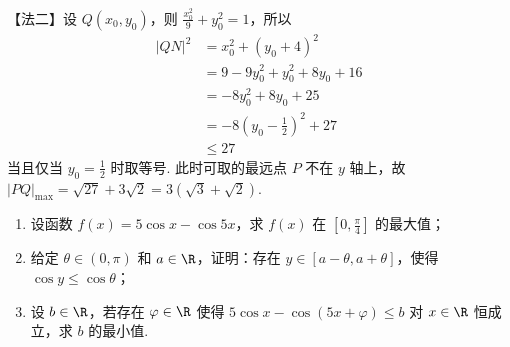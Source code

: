 \begin{solution}
\begin{enumerate}
\begin{enumerate}
【法二】设 \(Q(x_0,y_0)\)，则 \(\frac{x_0^2}{9}+y_0^2=1\)，所以
\begin{align*}
|QN|^2&=x_0^2+(y_0+4)^2\\
&=9-9y_0^2+y_0^2+8y_0+16\\
&=-8y_0^2+8y_0+25\\
&=-8\left(y_0-\frac{1}{2}\right)^2+27\\
&\le 27
\end{align*}
当且仅当 \(y_0=\frac{1}{2}\) 时取等号. 此时可取的最远点 \(P\) 不在 \(y\) 轴上，故 \(|PQ|_{\max}=\sqrt{27}+3\sqrt{2}=3(\sqrt{3}+\sqrt{2})\).
\end{enumerate}
\end{enumerate}
\end{solution}

\begin{problem}

\begin{enumerate}
\item 设函数 \(f(x) = 5\cos x - \cos 5x\)，求 \(f(x)\) 在 \(\left[0, \frac{\pi}{4}\right]\) 的最大值；
\item 给定 \(\theta \in (0,\pi)\) 和 \(a \in \R\)，证明：存在 \(y \in [a - \theta, a + \theta]\)，使得 \(\cos y \le \cos \theta\)；
\item 设 \(b \in \R\)，若存在 \(\varphi \in \R\) 使得 \(5\cos x - \cos (5x + \varphi) \le b\) 对 \(x \in \R\) 恒成立，求 \(b\) 的最小值.
\end{enumerate}
\end{problem}

